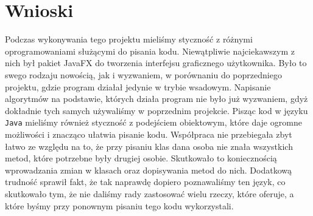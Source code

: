 \documentclass[]{article}
\begin{document}
\section{Wnioski}\label{header-n279}
Podczas wykonywania tego projektu mieliśmy styczność z różnymi oprogramowaniami służącymi do pisania kodu. Niewątpliwie najciekawszym z nich był pakiet JavaFX do tworzenia interfejsu graficznego użytkownika. Było to swego rodzaju nowością, jak i wyzwaniem, w porównaniu do poprzedniego projektu, gdzie program działał jedynie w trybie wsadowym. Napisanie algorytmów na podstawie, których działa program nie było już wyzwaniem, gdyż dokładnie tych samych używaliśmy w poprzednim projekcie. Pisząc kod w języku \texttt{Java} mieliśmy również styczność z podejściem obiektowym, które daje ogromne możliwości i znacząco ułatwia pisanie kodu. Współpraca nie przebiegała zbyt łatwo ze względu na to, że przy pisaniu klas dana osoba nie znała wszystkich metod, które potrzebne były drugiej osobie. Skutkowało to koniecznością wprowadzania zmian w klasach oraz dopisywania metod do nich. Dodatkową trudność sprawił fakt, że tak naprawdę dopiero poznawaliśmy ten język, co skutkowało tym, że nie daliśmy rady zastosować wielu rzeczy, które oferuje, a które byśmy przy ponownym pisaniu tego kodu wykorzystali.
\end{document}
